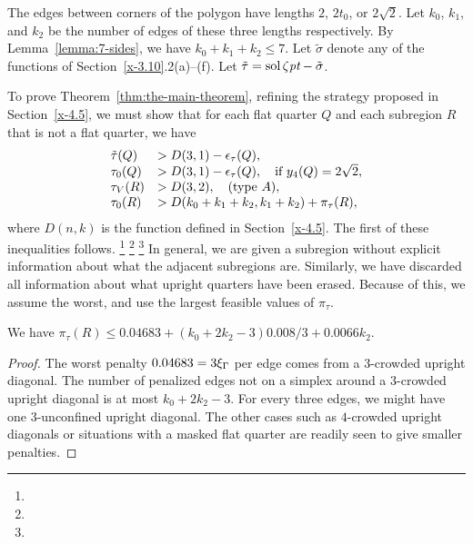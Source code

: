 The edges between corners of the polygon have lengths $2$, $2t_0$, or
$2\sqrt{2}$.  Let $k_0$, $k_1$, and $k_2$ be the number of edges of
these three lengths respectively.  By Lemma~\ref{lemma:7-sides}, we have
$k_0+k_1+k_2\le7$. Let $\tilde\sigma$ denote any of the functions of
Section~\ref{x-3.10}.2(a)--(f). Let $\tilde\tau = \operatorname{sol}\zeta\hbox{\it pt} -
\tilde\sigma$.

To prove Theorem~\ref{thm:the-main-theorem}, refining the strategy
proposed in Section~\ref{x-4.5}, we must show that for each flat quarter
$Q$ and each subregion $R$ that is not a flat quarter, we have
    \begin{equation}
    \begin{array}{lll}
    \tilde\tau(Q) &> D(3,1) - \epsilon_\tau(Q),\\
    \tau_0(Q) &> D(3,1)-\epsilon_\tau(Q),\quad\text{if }y_4(Q)=2\sqrt2,\\
    \tau_V(R) &> D(3,2),\quad\text{(type $A$)},\\
    \tau_0(R) &> D(k_0+k_1+k_2,k_1+k_2)+\pi_\tau(R),
    \label{eqn:tau>D(n,k)}
    \end{array}
    \end{equation}
where $D(n,k)$ is the function defined in Section~\ref{x-4.5}. The first
of these inequalities follows.%
\footnote{} %
\footnote{} %
\footnote{} %
In general,
we are given a subregion without explicit information about what the
adjacent subregions are.  Similarly, we have discarded all information
about what upright quarters have been erased.  Because of this, we
assume the worst, and use the largest feasible values of $\pi_\tau$.

\begin{lemma}
We have
    $\pi_\tau(R)\le 0.04683 + (k_0+2k_2-3)0.008/3 +0.0066k_2$.
\end{lemma}

\begin{proof}
The worst penalty $0.04683=3\xi_\Gamma$ per edge comes from a
$3$-crowded upright diagonal. The number of penalized edges not on
a simplex around a $3$-crowded upright diagonal is at most
$k_0+2k_2-3$. For every three edges, we might have one
$3$-unconfined upright diagonal. The other cases such as
$4$-crowded upright diagonals or situations with a masked flat
quarter are readily seen to give smaller penalties.
\end{proof}

